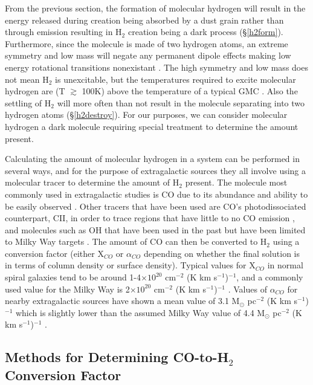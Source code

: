 From the previous section, the formation of molecular hydrogen will result in the energy released during creation being absorbed by a dust grain rather than through emission resulting in H$_2$ creation being a dark process (\S\ref{h2form}).  Furthermore, since the molecule is made of two hydrogen atoms, an extreme symmetry and low mass will negate any permanent dipole effects making low energy rotational transitions nonexistant \citep{bolatto2013,kennicutt2012}.  The high symmetry and low mass does not mean H$_2$ is unexcitable, but the temperatures required to excite molecular hydrogen are (T $\gtrsim$ 100K) above the temperature of a typical GMC \citep{bolatto2013}.  Also the settling of H$_2$ will more often than not result in the molecule separating into two hydrogen atoms (\S\ref{h2destroy}).  For our purposes, we can consider molecular hydrogen a dark molecule requiring special treatment to determine the amount present.

Calculating the amount of molecular hydrogen in a system can be performed in several ways, and for the purpose of extragalactic sources they all involve using a molecular tracer to determine the amount of H$_2$ present.  The molecule most commonly used in extragalactic studies is CO due to its abundance and ability to be easily observed \citep{bolatto2013}.  Other tracers that have been used are CO's photodissociated counterpart, CII, in order to trace regions that have little to no CO emission \citep{madden1997}, and molecules such as OH that have been used in the past but have been limited to Milky Way targets \citep{barrett1964}.  The amount of CO can then be converted to H$_2$ using a conversion factor (either X$_{CO}$ or $\alpha_{CO}$ depending on whether the final solution is in terms of column density or surface density).  Typical values for X$_{CO}$ in normal spiral galaxies tend to be around 1-4$\times 10^{20}$ cm$^{-2}$ (K km s$^{-1}$)$^{-1}$, and a commonly used value for the Milky Way is 2$\times 10^{20}$ cm$^{-2}$ (K km s$^{-1}$)$^{-1}$ \citep{bolatto2013}. Values of $\alpha_{CO}$ for nearby extragalactic sources have shown a mean value of 3.1 M$_\odot$ pc$^{-2}$ (K km s$^{-1}$)$^{-1}$ which is slightly lower than the assumed Milky Way value of 4.4 M$_\odot$ pc$^{-2}$ (K km s$^{-1}$)$^{-1}$ \citep{sandstrom2013}.

\subsection{Methods for Determining CO-to-H$_2$ Conversion Factor}\label{gettinx}

